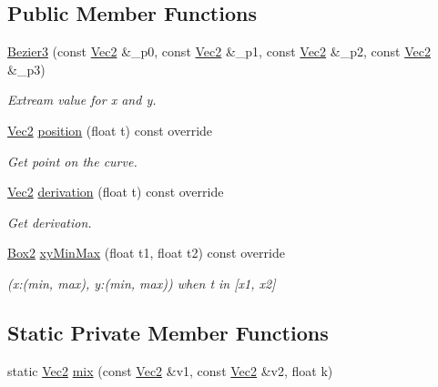 \subsection*{Public Member Functions}
\begin{DoxyCompactItemize}
\item 
\hyperlink{classBezier3_a7ecadca050fc7935c58c67de8b767dcf}{Bezier3} (const \hyperlink{vec_8h_a871640c4eb6057d21b25824c55250629}{Vec2} \&\+\_\+p0, const \hyperlink{vec_8h_a871640c4eb6057d21b25824c55250629}{Vec2} \&\+\_\+p1, const \hyperlink{vec_8h_a871640c4eb6057d21b25824c55250629}{Vec2} \&\+\_\+p2, const \hyperlink{vec_8h_a871640c4eb6057d21b25824c55250629}{Vec2} \&\+\_\+p3)
\begin{DoxyCompactList}\small\item\em Extream value for x and y. \end{DoxyCompactList}\item 
\hyperlink{vec_8h_a871640c4eb6057d21b25824c55250629}{Vec2} \hyperlink{classBezier3_afd1907f62d8d19b4683f43080a0334db}{position} (float t) const override
\begin{DoxyCompactList}\small\item\em Get point on the curve. \end{DoxyCompactList}\item 
\hyperlink{vec_8h_a871640c4eb6057d21b25824c55250629}{Vec2} \hyperlink{classBezier3_a8f3bc3ba14dae6e9f27366ef587accc5}{derivation} (float t) const override
\begin{DoxyCompactList}\small\item\em Get derivation. \end{DoxyCompactList}\item 
\hyperlink{structBox2}{Box2} \hyperlink{classBezier3_aa5a1d33483071204f99774fefb092caf}{xy\+Min\+Max} (float t1, float t2) const override
\begin{DoxyCompactList}\small\item\em (x\+:(min, max), y\+:(min, max)) when t in \mbox{[}x1, x2\mbox{]} \end{DoxyCompactList}\end{DoxyCompactItemize}
\subsection*{Static Private Member Functions}
\begin{DoxyCompactItemize}
\item 
static \hyperlink{vec_8h_a871640c4eb6057d21b25824c55250629}{Vec2} \hyperlink{classBezier3_a023a628ce0ed0750b3bf9c00086843aa}{mix} (const \hyperlink{vec_8h_a871640c4eb6057d21b25824c55250629}{Vec2} \&v1, const \hyperlink{vec_8h_a871640c4eb6057d21b25824c55250629}{Vec2} \&v2, float k)
\end{DoxyCompactItemize}

